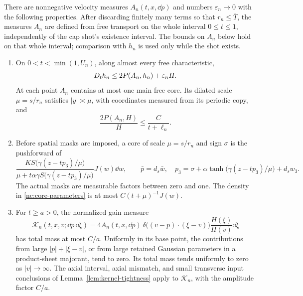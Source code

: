 \begin{lemma}
\label{nc:core-kernels}
There are nonnegative velocity measures \(A_n(t,x,\dd p)\) and numbers
\(\varepsilon_n\to0\) with the following properties.
After discarding finitely many terms so that \(r_n\le\overline T\),
the measures \(A_n\) are defined from free transport on the whole interval
\(0\le t\le1\), independently of the cap shot's existence interval.
The bounds on \(A_n\) below hold on that whole interval; comparison with
\(h_n\) is used only while the shot exists.

\begin{enumerate}[label=\textup{(\roman*)}]
\item On \(0<t<\min(1,U_n)\), along almost every free characteristic,
\begin{equation}
\label{nc:positive-equation}
 D_t h_n\le 2P(A_n,h_n)+\varepsilon_n H .
\end{equation}
At each point \(A_n\) contains at most one main free core.  Its dilated
scale \(\mu=s/r_n\) satisfies \(|y|\asymp\mu\), with coordinates measured
from its periodic copy, and
\[
 \frac{2P(A_n,H)}{H}\le\frac{C}{t+\ell_n}.
\]

\item Before spatial masks are imposed, a core of scale
\(\mu=s/r_n\) and sign \(\sigma\) is the pushforward of
\begin{equation}
\label{nc:core-parameters}
 \frac{K S\bigl(\gamma(z-tp_3)/\mu\bigr)}
      {\mu+t\alpha\gamma S\bigl(\gamma(z-tp_3)/\mu\bigr)}
 J(w)\dd w ,
 \qquad
 \bar p=d_s\bar w,\quad
 p_3=\sigma+\alpha\tanh\bigl(\gamma(z-tp_3)/\mu\bigr)+d_sw_3 .
\end{equation}
The actual masks are measurable factors between zero and one.
The density in \eqref{nc:core-parameters} is at most
\(C(t+\mu)^{-1}J(w)\).

\item For \(t\ge a>0\), the normalized gain measure
\begin{equation}
\label{nc:normalized-kernel}
 \mathcal K_n(t,x,v;\dd p\,\dd\xi)
 =
 4A_n(t,x,\dd p)\,
 \delta\bigl((v-p)\cdot(\xi-v)\bigr)
 \frac{H(\xi)}{H(v)}\dd\xi
\end{equation}
has total mass at most \(C/a\).  Uniformly in its base point, the
contributions from large \(|p|+|\xi-v|\), or from large retained
Gaussian parameters in a product-sheet majorant, tend to zero.
Its total mass tends uniformly to zero as \(|v|\to\infty\).
The axial interval, axial mismatch, and small transverse input
conclusions of Lemma~\ref{lem:kernel-tightness} apply to
\(\mathcal K_n\), with the amplitude factor \(C/a\).
\end{enumerate}
\end{lemma}

